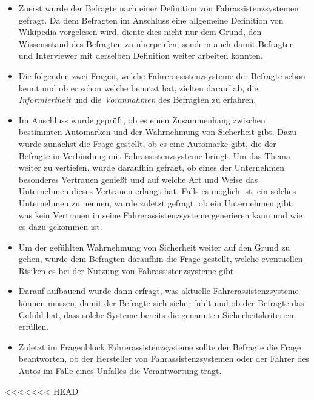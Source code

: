 \documentclass[12pt]{article}
\begin{document}
\begin{itemize}
  \item Zuerst wurde der Befragte nach einer Definition von Fahrassistenzsystemen gefragt. Da dem Befragten im Anschluss eine allgemeine Definition von Wikipedia vorgelesen wird, diente dies nicht nur dem Grund, den Wissensstand des Befragten zu überprüfen, sondern auch damit Befragter und Interviewer mit derselben Definition weiter arbeiten konnten.

  \item Die folgenden zwei Fragen, welche Fahrerassistenzsysteme der Befragte schon kennt und ob er schon welche benutzt hat, zielten darauf ab, die \emph{Informiertheit} und die \emph{Vorannahmen} des Befragten zu erfahren.

  \item Im Anschluss wurde geprüft, ob es einen Zusammenhang zwischen bestimmten Automarken und der Wahrnehmung von Sicherheit gibt. Dazu wurde zunächst die Frage gestellt, ob es eine Automarke gibt, die der Befragte in Verbindung mit Fahrassistenzsysteme bringt. Um das Thema weiter zu vertiefen, wurde daraufhin gefragt, ob eines der Unternehmen besonderes Vertrauen genießt und auf welche Art und Weise das Unternehmen dieses Vertrauen erlangt hat. Falls es möglich ist, ein solches Unternehmen zu nennen, wurde zuletzt gefragt, ob ein Unternehmen gibt, was kein Vertrauen in seine Fahrerassistenzsysteme generieren kann und wie es dazu gekommen ist.

  \item Um der gefühlten Wahrnehmung von Sicherheit weiter auf den Grund zu gehen, wurde dem Befragten daraufhin die Frage gestellt, welche eventuellen Risiken es bei der Nutzung von Fahrassistenzsysteme gibt.

  \item Darauf aufbauend wurde dann erfragt, was aktuelle Fahrerassistenzsysteme können müssen, damit der Befragte sich sicher fühlt und ob der Befragte das Gefühl hat, dass solche Systeme bereits die genannten Sicherheitskriterien erfüllen.

  \item Zuletzt im Fragenblock Fahrerassistenzsysteme sollte der Befragte die Frage beantworten, ob der Hersteller von Fahrassistenzsystemen oder der Fahrer des Autos im Falle eines Unfalles die Verantwortung trägt.
\end{itemize}

<<<<<<< HEAD
\end{document}
